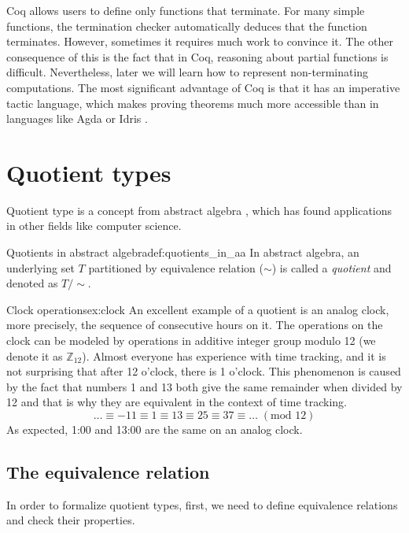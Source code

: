 Coq allows users to define only functions that terminate. For many simple functions, the termination checker automatically deduces that the function terminates. However, sometimes it requires much work to convince it. The other consequence of this is the fact that in Coq, reasoning about partial functions is difficult. Nevertheless, later we will learn how to represent non-terminating computations. The most significant advantage of Coq is that it has an imperative tactic language, which makes proving theorems much more accessible than in languages like Agda \cite{agda} or Idris \cite{idris}.

\section{Quotient types}
Quotient type is a concept from abstract algebra \cite{AbstractAlgebra}, which has found applications in other fields like computer science.
\begin{defi}{Quotients in abstract algebra}{def:quotients_in_aa}
In abstract algebra, an underlying set $T$ partitioned by equivalence relation ($\sim$) is called a \emph{quotient} and denoted as $T/\sim$.
\end{defi}
\begin{example}{Clock operations}{ex:clock}
An excellent example of a quotient is an analog clock, more precisely, the sequence of consecutive hours on it. The operations on the clock can be modeled by operations in additive integer group modulo 12 (we denote it as $\mathbb{Z}_{12}$). Almost everyone has experience with time tracking, and it is not surprising that after 12 o'clock, there is 1 o'clock. This phenomenon is caused by the fact that numbers 1 and 13 both give the same remainder when divided by 12 and that is why they are equivalent in the context of time tracking.
$$\ldots \equiv -11 \equiv 1 \equiv 13 \equiv 25 \equiv 37 \equiv \ldots \; (\textrm{mod } 12) $$
As expected, 1:00 and 13:00 are the same on an analog clock.
\end{example}

\subsection{The equivalence relation}
In order to formalize quotient types, first, we need to define equivalence relations and check their properties.

